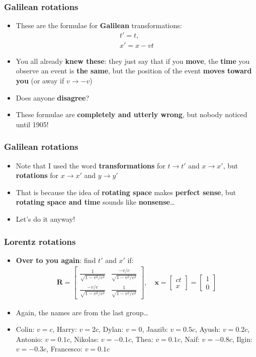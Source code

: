 \documentclass{beamer}
\begin{document}
\begin{frame}
  \frametitle{Galilean rotations}
  \begin{itemize}
    \item<1-> These are the formulae for \textbf{Galilean} transformations:
      \begin{gather*}
	t'=t,\\
	x'=x-vt
      \end{gather*}
    \item<2-> You all already \textbf{knew these}: they just say that if you \textbf{move}, the \textbf{time} you observe an event is \textbf{the same}, but the position of the event \textbf{moves toward you} (or away if $v\to -v$)
    \item<3-> Does anyone \textbf{disagree}?
    \item<4-> These formulae are \textbf{completely and utterly wrong}, but nobody noticed until 1905!
  \end{itemize}
\end{frame}

\begin{frame}
  \frametitle{Galilean rotations}
  \begin{itemize}
    \item<1-> Note that I used the word \textbf{transformations} for $t\to t'$ and $x\to x'$, but \textbf{rotations} for $x\to x'$ and $y\to y'$
    \item<2-> That is because the idea of \textbf{rotating space} makes \textbf{perfect sense}, but \textbf{rotating space and time} sounds like \textbf{nonsense}\ldots
    \item<3-> Let's do it anyway!
  \end{itemize}
\end{frame}

\begin{frame}
  \frametitle{Lorentz rotations}
  \begin{itemize}
    \item<1-> \textbf{Over to you again}: find $t'$ and $x'$ if:
      \begin{align*}
	\mathbf{R}=
	\begin{bmatrix}
	  \frac{1}{\sqrt{1-v^2/c^2}} & \frac{-v/c}{\sqrt{1-v^2/c^2}}\\
	  \frac{-v/c}{\sqrt{1-v^2/c^2}} & \frac{1}{\sqrt{1-v^2/c^2}}
	\end{bmatrix}
	, \quad
	\mathbf{x}=
	\begin{bmatrix}
	  ct\\
	  x
	\end{bmatrix}
	=
	\begin{bmatrix}
	  1\\
	  0
	\end{bmatrix}
      \end{align*}
    \item<2-> Again, the names are from the last group\ldots
    \item<2-> Colin: $v=c$, Harry: $v=2c$, Dylan: $v=0$, Jaazib: $v=0.5c$, Ayush: $v=0.2c$, Antonio: $v=0.1c$, Nikolas: $v=-0.1c$, Thea: $v=0.1c$, Naif: $v=-0.8c$, Ilgin: $v=-0.3c$, Francesco: $v=0.1c$
  \end{itemize}
\end{frame}
\end{document}
